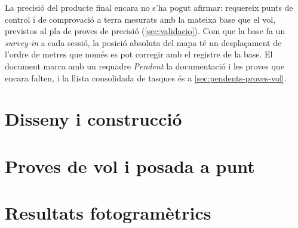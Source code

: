 \documentclass[11pt,a4paper,openany]{book}
\begin{document}
La precisió del producte final encara no s'ha pogut afirmar: requereix punts de control i de comprovació a terra mesurats amb la mateixa base que el vol, previstos al pla de proves de precisió (\cref{sec:validacio}). Com que la base fa un \emph{survey-in} a cada sessió, la posició absoluta del mapa té un desplaçament de l'ordre de metres que només es pot corregir amb el registre de la base. El document marca amb un requadre \emph{Pendent} la documentació i les proves que encara falten, i la llista consolidada de tasques és a \cref{sec:pendents-proves-vol}.

\tableofcontents

\mainmatter

\part{Disseny i construcció}



\part{Proves de vol i posada a punt}


\part{Resultats fotogramètrics}


\backmatter
\printbibliography[title={Referències}]
\end{document}

